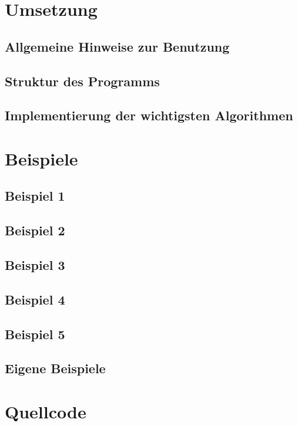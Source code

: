 \documentclass[a4paper, notitlepage, 12pt]{scrartcl}
\begin{document}
\section{Umsetzung}
\subsection{Allgemeine Hinweise zur Benutzung}
\subsection{Struktur des Programms}
\subsection{Implementierung der wichtigsten Algorithmen}

\section{Beispiele}
\subsection{Beispiel 1}
\subsection{Beispiel 2}
\subsection{Beispiel 3}
\subsection{Beispiel 4}
\subsection{Beispiel 5}
\subsection{Eigene Beispiele}

 \section{Quellcode}
 \renewcommand{\listingscaption}{Quellcode}
 
 
\end{document}
